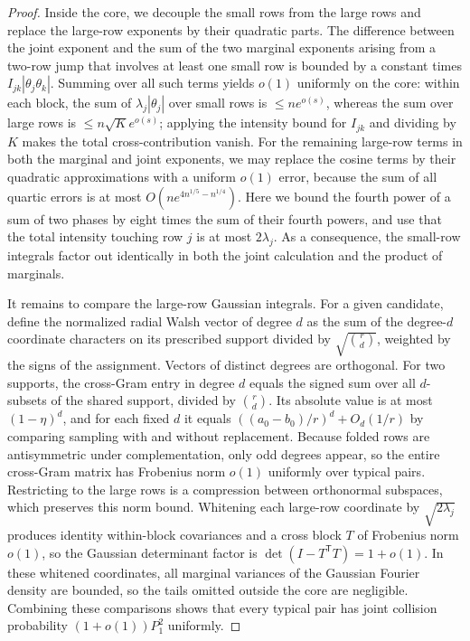 \begin{proof}
Inside the core, we decouple the small rows from the large rows and replace the large-row exponents by their quadratic parts. The difference between the joint exponent and the sum of the two marginal exponents arising from a two-row jump that involves at least one small row is bounded by a constant times \(I_{jk}|\theta_j\theta_k|\). Summing over all such terms yields \(o(1)\) uniformly on the core: within each block, the sum of \(\lambda_j|\theta_j|\) over small rows is \(\le n e^{o(s)}\), whereas the sum over large rows is \(\le n\sqrt K e^{o(s)}\); applying the intensity bound for \(I_{jk}\) and dividing by \(K\) makes the total cross-contribution vanish. For the remaining large-row terms in both the marginal and joint exponents, we may replace the cosine terms by their quadratic approximations with a uniform \(o(1)\) error, because the sum of all quartic errors is at most \(O(n e^{4n^{1/5}-n^{1/4}})\). Here we bound the fourth power of a sum of two phases by eight times the sum of their fourth powers, and use that the total intensity touching row \(j\) is at most \(2\lambda_j\). As a consequence, the small-row integrals factor out identically in both the joint calculation and the product of marginals.

It remains to compare the large-row Gaussian integrals. For a given candidate, define the normalized radial Walsh vector of degree \(d\) as the sum of the degree-\(d\) coordinate characters on its prescribed support divided by \(\sqrt{\binom rd}\), weighted by the signs of the assignment. Vectors of distinct degrees are orthogonal. For two supports, the cross-Gram entry in degree \(d\) equals the signed sum over all \(d\)-subsets of the shared support, divided by \(\binom rd\). Its absolute value is at most \((1-\eta)^d\), and for each fixed \(d\) it equals \(((a_0-b_0)/r)^d+O_d(1/r)\) by comparing sampling with and without replacement. Because folded rows are antisymmetric under complementation, only odd degrees appear, so the entire cross-Gram matrix has Frobenius norm \(o(1)\) uniformly over typical pairs. Restricting to the large rows is a compression between orthonormal subspaces, which preserves this norm bound. Whitening each large-row coordinate by \(\sqrt{2\lambda_j}\) produces identity within-block covariances and a cross block \(T\) of Frobenius norm \(o(1)\), so the Gaussian determinant factor is \(\det(I-T^{\mathsf T}T)=1+o(1)\). In these whitened coordinates, all marginal variances of the Gaussian Fourier density are bounded, so the tails omitted outside the core are negligible. Combining these comparisons shows that every typical pair has joint collision probability \((1+o(1))P_1^2\) uniformly.


\end{proof}
